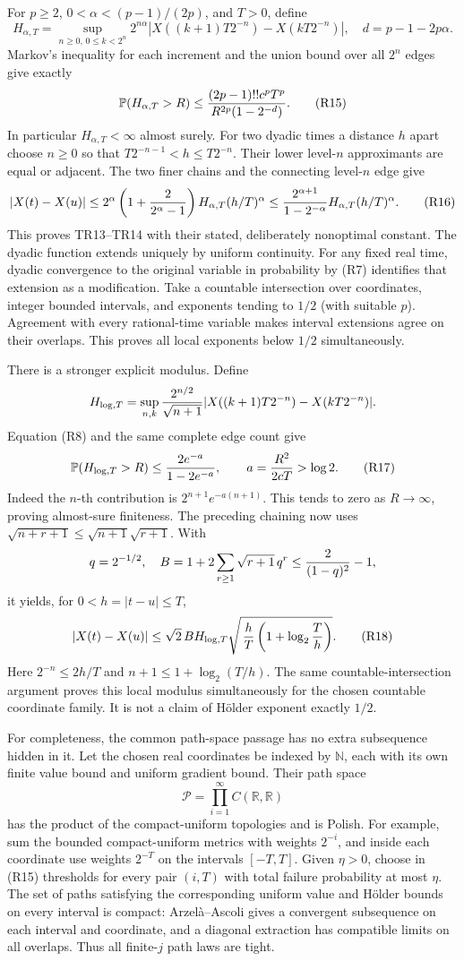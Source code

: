 \documentclass[11pt]{article}
\begin{document}
For \(p\ge2\), \(0<\alpha<(p-1)/(2p)\), and \(T>0\), define
\[
 H_{\alpha,T}=\sup_{n\ge0,\,0\le k<2^n}
  2^{n\alpha}|X((k+1)T2^{-n})-X(kT2^{-n})|,\quad
 d=p-1-2p\alpha.
\]
Markov's inequality for each increment and the union bound over all
\(2^n\) edges give exactly
\[
 \mathbb P(H_{\alpha,T}>R)
 \le{(2p-1)!!c^pT^p\over R^{2p}(1-2^{-d})}. \tag{R15}
\]
In particular \(H_{\alpha,T}<\infty\) almost surely. For two dyadic
times a distance \(h\) apart choose \(n\ge0\) so that
\(T2^{-n-1}<h\le T2^{-n}\).
Their lower level-\(n\) approximants are equal or adjacent.
The two finer chains and the connecting level-\(n\) edge give
\[
 |X(t)-X(u)|\le
 2^\alpha\left(1+{2\over2^\alpha-1}\right)
 H_{\alpha,T}(h/T)^\alpha
 \le {2^{\alpha+1}\over1-2^{-\alpha}}H_{\alpha,T}(h/T)^\alpha.
 \tag{R16}
\]
This proves TR13–TR14 with their stated, deliberately nonoptimal
constant. The dyadic function extends uniquely by uniform continuity.
For any fixed real time, dyadic convergence to the original variable
in probability by (R7) identifies that extension as a modification.
Take a countable intersection over coordinates, integer bounded intervals,
and exponents tending to \(1/2\) (with suitable \(p\)).
Agreement with every rational-time variable makes interval extensions
agree on their overlaps. This proves all local exponents below
\(1/2\) simultaneously.

There is a stronger explicit modulus. Define
\[
 H_{\log,T}=\sup_{n,k}{2^{n/2}\over\sqrt{n+1}}
   |X((k+1)T2^{-n})-X(kT2^{-n})|.
\]
Equation (R8) and the same complete edge count give
\[
 \mathbb P(H_{\log,T}>R)\le
 {2e^{-a}\over1-2e^{-a}},\qquad
 a={R^2\over2cT}>\log2. \tag{R17}
\]
Indeed the \(n\)-th contribution is \(2^{n+1}e^{-a(n+1)}\).
This tends to zero as \(R\to\infty\), proving almost-sure finiteness.
The preceding chaining now uses
\(\sqrt{n+r+1}\le\sqrt{n+1}\sqrt{r+1}\). With
\[
 q=2^{-1/2},\quad
 B=1+2\sum_{r\ge1}\sqrt{r+1}\,q^r
 \le {2\over(1-q)^2}-1,
\]
it yields, for \(0<h=|t-u|\le T\),
\[
 |X(t)-X(u)|
 \le\sqrt2\,B H_{\log,T}
      \sqrt{\,{h\over T}\left(1+\log_2{T\over h}\right)}.
 \tag{R18}
\]
Here \(2^{-n}\le2h/T\) and \(n+1\le1+\log_2(T/h)\).
The same countable-intersection argument proves this local modulus
simultaneously for the chosen countable coordinate family.
It is not a claim of Hölder exponent exactly \(1/2\).

For completeness, the common path-space passage has no extra
subsequence hidden in it. Let the chosen real coordinates be indexed
by \(\mathbb N\), each with its own finite value bound and uniform
gradient bound. Their path space
\[
 \mathscr P=\prod_{i=1}^{\infty}C(\mathbb R,\mathbb R)
 \tag{R19}
\]
has the product of the compact-uniform topologies and is Polish.
For example, sum the bounded compact-uniform metrics with weights
\(2^{-i}\), and inside each coordinate use weights \(2^{-T}\) on
the intervals \([-T,T]\). Given \(\eta>0\), choose in (R15)
thresholds for every pair \((i,T)\) with total failure probability
at most \(\eta\). The set of paths satisfying the corresponding
uniform value and Hölder bounds on every interval is compact:
Arzelà–Ascoli gives a convergent subsequence on each interval and
coordinate, and a diagonal extraction has compatible limits on
all overlaps. Thus all finite-\(j\) path laws are tight.
\end{document}
